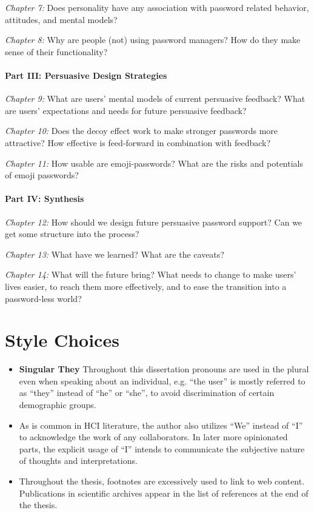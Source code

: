 \textit{Chapter 7:} %
Does personality have any association with password related behavior, attitudes, and mental models?

\textit{Chapter 8:} %
Why are people (not) using password managers?
How do they make sense of their functionality?


\paragraph{Part III: Persuasive Design Strategies}
\textit{Chapter 9:} %
What are users' mental models of current persuasive feedback?
What are users' expectations and needs for future persuasive feedback?

\textit{Chapter 10:} %
Does the decoy effect work to make stronger passwords more attractive?
How effective is feed-forward in combination with feedback?

\textit{Chapter 11:} %
How usable are emoji-passwords?
What are the risks and potentials of emoji passwords?

\paragraph{Part IV: Synthesis}
\textit{Chapter 12:} %
How should we design future persuasive password support?
Can we get some structure into the process? 

\textit{Chapter 13:} %
What have we learned? 
What are the caveats?

\textit{Chapter 14:} %
What will the future bring?
What needs to change to make users' lives easier, to reach them more effectively, and to ease the transition into a password-less world?

\section{Style Choices}
\begin{itemize}
\item \textbf{Singular They} Throughout this dissertation pronouns are used in the plural even when speaking about an individual, e.g. ``the user'' is mostly referred to as ``they'' instead of ``he'' or ``she'', to avoid discrimination of certain demographic groups. 
\item As is common in HCI literature, the author also utilizes ``We'' instead of ``I'' to acknowledge the work of any collaborators. In later more opinionated parts, the explicit usage of ``I'' intends to communicate the subjective nature of thoughts and interpretations.
\item Throughout the thesis, footnotes are excessively used to link to web content. Publications in scientific archives appear in the list of references at the end of the thesis.
\end{itemize}
